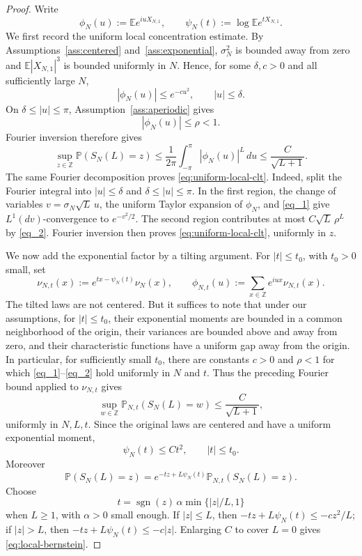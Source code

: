 \documentclass[10pt,a4paper]{amsart}
\newcommand{\Ee}{\mathbb E}
\newcommand{\Pp}{\mathbb P}
\newcommand{\Z}{\mathbb Z}
\begin{document}
\begin{proof}
Write
\[
 \phi_N(u):=\Ee e^{iuX_{N,1}},
 \qquad
 \psi_N(t):=\log\Ee e^{tX_{N,1}} .
\]
We first record the uniform local concentration estimate. By
Assumptions~\ref{ass:centered} and~\ref{ass:exponential},
\(\sigma_N^2\) is bounded away from zero and
\(\Ee |X_{N,1}|^3\) is bounded uniformly in \(N\). Hence, for some
\(\delta,c>0\) and all sufficiently large \(N\),
\begin{equation}\label{eq_1}
 |\phi_N(u)|\le e^{-cu^2},\qquad |u|\le\delta .
\end{equation}
On \(\delta\le |u|\le\pi\), Assumption~\ref{ass:aperiodic} gives
\begin{equation}\label{eq_2}|\phi_N(u)|\le\rho<1.\end{equation}
Fourier inversion therefore gives
\[
 \sup_{z\in\Z}\Pp(S_N(L)=z)
 \le
 \frac1{2\pi}\int_{-\pi}^{\pi}|\phi_N(u)|^L\,du
 \le \frac{C}{\sqrt{L+1}} .
\]
The same Fourier decomposition proves
\eqref{eq:uniform-local-clt}.  Indeed, split the Fourier integral into \(|u|\le\delta\) and
\(\delta\le |u|\le\pi\).  In the first region, the change of variables
\(v=\sigma_N\sqrt L\,u\), the uniform Taylor expansion of \(\phi_N\),
and \eqref{eq_1} give \(L^1(dv)\)-convergence to \(e^{-v^2/2}\).
The second region contributes at most \(C\sqrt L\,\rho^L\) by
\eqref{eq_2}.  Fourier inversion then proves
\eqref{eq:uniform-local-clt}, uniformly in \(z\).

We now add the exponential factor by a tilting argument. For
\(|t|\le t_0\), with \(t_0>0\) small, set
\[
 \nu_{N,t}(x):=e^{tx-\psi_N(t)}\nu_N(x),
 \qquad
 \phi_{N,t}(u):=\sum_{x\in\Z}e^{iux}\nu_{N,t}(x).
\]
The tilted laws are not centered. But it suffices to note that under our assumptions, for $|t|\le t_0$, their exponential moments are bounded in a
common neighborhood of the origin, their variances are bounded above
and away from zero, and their characteristic functions have a uniform
gap away from the origin. In particular,
for sufficiently small \(t_0\), there are constants \(c>0\) and
\(\rho<1\) for which \eqref{eq_1}--\eqref{eq_2} hold uniformly in
\(N\) and \(t\). Thus the preceding Fourier bound
applied to \(\nu_{N,t}\) gives
\[
 \sup_{w\in\Z}\Pp_{N,t}(S_N(L)=w)\le \frac{C}{\sqrt{L+1}},
\]
uniformly in \(N,L,t\). Since the original laws are centered and have a
uniform exponential moment,
\[
 \psi_N(t)\le Ct^2,\qquad |t|\le t_0 .
\]
Moreover
\[
 \Pp(S_N(L)=z)
 =
 e^{-tz+L\psi_N(t)}\Pp_{N,t}(S_N(L)=z).
\]
Choose
\[
 t=\operatorname{sgn}(z)\,\alpha\min\{|z|/L,1\}
\]
when \(L\ge1\), with \(\alpha>0\) small enough. If \(|z|\le L\), then
\(-tz+L\psi_N(t)\le -c z^2/L\); if \(|z|>L\), then
\(-tz+L\psi_N(t)\le -c|z|\). Enlarging \(C\) to cover \(L=0\) gives
\eqref{eq:local-bernstein}.


\end{proof}
\end{document}

